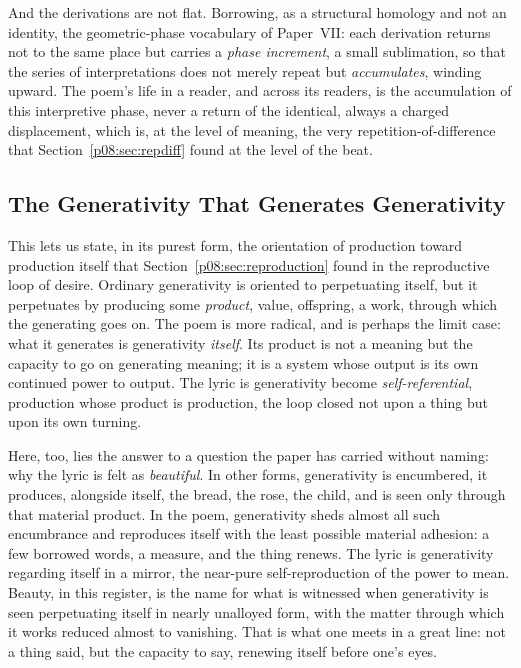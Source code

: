 And the derivations are not flat. Borrowing, as a structural homology and not an identity, the geometric-phase vocabulary of Paper~VII: each derivation returns not to the same place but carries a \emph{phase increment}, a small sublimation, so that the series of interpretations does not merely repeat but \emph{accumulates}, winding upward. The poem's life in a reader, and across its readers, is the accumulation of this interpretive phase, never a return of the identical, always a charged displacement, which is, at the level of meaning, the very repetition-of-difference that Section~\ref{p08:sec:repdiff} found at the level of the beat.

\subsection{The Generativity That Generates Generativity}\label{p08:sec:grammar-self}

This lets us state, in its purest form, the orientation of production toward production itself that Section~\ref{p08:sec:reproduction} found in the reproductive loop of desire. Ordinary generativity is oriented to perpetuating itself, but it perpetuates by producing some \emph{product}, value, offspring, a work, through which the generating goes on. The poem is more radical, and is perhaps the limit case: what it generates is generativity \emph{itself}. Its product is not a meaning but the capacity to go on generating meaning; it is a system whose output is its own continued power to output. The lyric is generativity become \emph{self-referential}, production whose product is production, the loop closed not upon a thing but upon its own turning.

Here, too, lies the answer to a question the paper has carried without naming: why the lyric is felt as \emph{beautiful}. In other forms, generativity is encumbered, it produces, alongside itself, the bread, the rose, the child, and is seen only through that material product. In the poem, generativity sheds almost all such encumbrance and reproduces itself with the least possible material adhesion: a few borrowed words, a measure, and the thing renews. The lyric is generativity regarding itself in a mirror, the near-pure self-reproduction of the power to mean. Beauty, in this register, is the name for what is witnessed when generativity is seen perpetuating itself in nearly unalloyed form, with the matter through which it works reduced almost to vanishing. That is what one meets in a great line: not a thing said, but the capacity to say, renewing itself before one's eyes.

